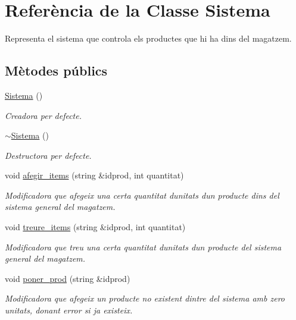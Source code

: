 \hypertarget{class_sistema}{}\section{Referència de la Classe Sistema}
\label{class_sistema}


Representa el sistema que controla els productes que hi ha dins del magatzem.  


\subsection*{Mètodes públics}
\begin{DoxyCompactItemize}
\item 
\hyperlink{class_sistema_a815b07845ef6b03247b239333fe75e28}{Sistema} ()
\begin{DoxyCompactList}\small\item\em Creadora per defecte. \end{DoxyCompactList}\item 
\hyperlink{class_sistema_aafc86e0f2c3d734fb4c0985f70c27a1a}{$\sim$\+Sistema} ()
\begin{DoxyCompactList}\small\item\em Destructora per defecte. \end{DoxyCompactList}\item 
void \hyperlink{class_sistema_ac56c15dc1f293214b694646a8273d22a}{afegir\+\_\+items} (string \&idprod, int quantitat)
\begin{DoxyCompactList}\small\item\em Modificadora que afegeix una certa quantitat d\textquotesingle{}unitats d\textquotesingle{}un producte dins del sistema general del magatzem. \end{DoxyCompactList}\item 
void \hyperlink{class_sistema_a1597f02c0f2a0f5b3d9582fb45e8400e}{treure\+\_\+items} (string \&idprod, int quantitat)
\begin{DoxyCompactList}\small\item\em Modificadora que treu una certa quantitat d\textquotesingle{}unitats d\textquotesingle{}un producte del sistema general del magatzem. \end{DoxyCompactList}\item 
void \hyperlink{class_sistema_abb3cc435ff5eb055f3d640494d418fa7}{poner\+\_\+prod} (string \&idprod)
\begin{DoxyCompactList}\small\item\em Modificadora que afegeix un producte no existent dintre del sistema amb zero unitats, donant error si ja existeix. \end{DoxyCompactList}\item 

\end{DoxyCompactItemize}
